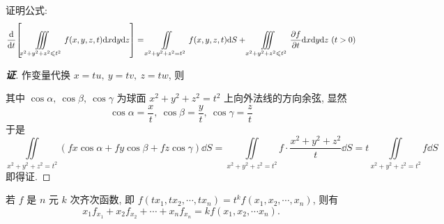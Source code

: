 \begin{example}
    证明公式:
    $$\dv{t}\qty[\iiint\limits_{x^2+y^2+z^2\leqslant t^2}f(x,y,z,t)\dd x\dd y\dd z]=\iint\limits_{x^2+y^2+z^2=t^2}f(x,y,z,t)\dd S+\iiint\limits_{x^2+y^2+z^2\leqslant t^2}\pdv{f}{t}\dd x\dd y\dd z~ (t>0)$$
\end{example}
\begin{proof}[{\songti \textbf{证}}]
    作变量代换 $x=tu,~y=tv,~z=tw$, 则
    其中 $\cos\alpha,~\cos\beta,~\cos\gamma$ 为球面 $x^2+y^2+z^2=t^2$ 上向外法线的方向余弦, 显然 $$\cos\alpha=\dfrac{x}{t},~\cos\beta=\dfrac{y}{t},~\cos\gamma=\dfrac{z}{t}$$
    于是 $$\iint\limits_{x^2+y^2+z^2=t^2}(fx\cos\alpha+fy\cos\beta+fz\cos\gamma)\dd S=\iint\limits_{x^2+y^2+z^2=t^2}f\cdot\dfrac{x^2+y^2+z^2}{t}\dd S=t\iint\limits_{x^2+y^2+z^2=t^2}f\dd S$$
    即得证.
\end{proof}

\begin{theorem}
    若 $f$ 是 $n$ 元 $k$ 次齐次函数, 即 $f(tx_1, tx_2, \cdots , tx_n)=t^{k}f(x_1, x_2, \cdots ,x_n)$, 则有 
    $$
    x_1f_{x_{1}}+ x_2f_{x_{2}}+ \cdots +x_nf_{x_{n}}=kf(x_1, x_2, \cdots x_n).
    $$
\end{theorem}

